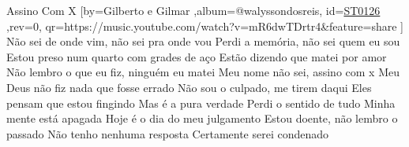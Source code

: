 \beginsong
{Assino Com X %
}[by={Gilberto e Gilmar %
},album={@walyssondosreis},
id={\href{https://music.youtube.com/watch?v=mR6dwTDrtr4&feature=share %
}{ST0126 %
}},rev={0}, %
qr={https://music.youtube.com/watch?v=mR6dwTDrtr4&feature=share %
}]
\beginverse
Não sei de onde vim, não sei pra onde vou
Perdi a memória, não sei quem eu sou
Estou preso num quarto com grades de aço
Estão dizendo que matei por amor
\endverse
\beginverse
Não lembro o que eu fiz, ninguém eu matei
Meu nome não sei, assino com x
Meu Deus não fiz nada que fosse errado
Não sou o culpado, me tirem daqui
\endverse
\beginchorus
Eles pensam que estou fingindo
Mas é a pura verdade
Perdi o sentido de tudo
Minha mente está apagada
Hoje é o dia do meu julgamento
Estou doente, não lembro o passado
Não tenho nenhuma resposta
Certamente serei condenado
\endchorus

